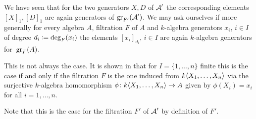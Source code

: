 \begin{remark}
  We have seen that for the two generators $X, D$ of $\operatorname{\mathcal{A}}'$ the corresponding elements $[X]_1, [D]_1$ are again generators of $\operatorname{gr}_{F'}(\operatorname{\mathcal{A}}')$.
  We may ask ourselves if more generally for every algebra $A$, filtration $F$ of $A$ and $k$-algebra generators $x_i$, $i \in I$ of degree $d_i \coloneqq \deg_F(x_i)$ the elements $[x_i]_{d_i}$, $i \in I$ are again $k$-algebra generators for~$\operatorname{gr}_F(A)$.
  
  This is not always the case.
  It is shown in \cite{MO224454} that for $I = \{1, \dotsc, n\}$ finite this is the case if and only if the filtration $F$ is the one induced from $k\langle X_1, \dotsc, X_n \rangle$ via the surjective $k$-algebra homomorphism $\phi \colon k\langle X_1, \dotsc, X_n \rangle \to A$ given by $\phi(X_i) = x_i$ for all $i = 1, \dotsc, n$.
  
  Note that this is the case for the filtration $F'$ of $\operatorname{\mathcal{A}}'$ by definition of $F'$.
\end{remark}



